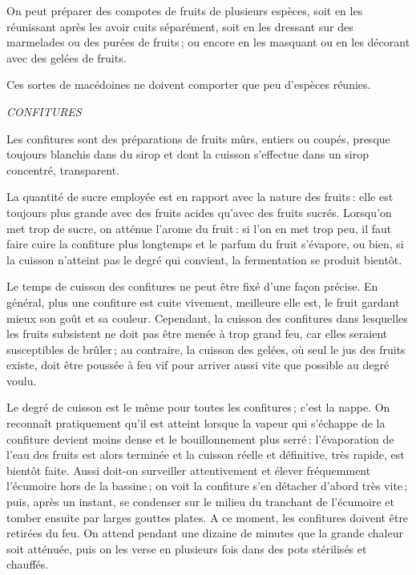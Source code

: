 On peut préparer des compotes de fruits de plusieurs espèces, soit en les
réunissant après les avoir cuits séparément, soit en les dressant sur des
marmelades ou des purées de fruits ; ou encore en les masquant ou en les
décorant avec des gelées de fruits.

Ces sortes de macédoines ne doivent comporter que peu d'espèces réunies.

\bigskip

\begin{center}
\textit{CONFITURES}
\end{center}

\bigskip


Les confitures sont des préparations de fruits mûrs, entiers ou coupés, presque
toujours blanchis dans du sirop et dont la cuisson s'effectue dans un sirop
concentré, transparent.

La quantité de sucre employée est en rapport avec la nature des fruits : elle
est toujours plus grande avec des fruits acides qu'avec des fruits sucrés.
Lorsqu'on met trop de sucre, on atténue l’arome du fruit : si l'on en met trop
peu, il faut faire cuire la confiture plus longtemps et le parfum du fruit
s'évapore, ou bien, si la cuisson n'atteint pas le degré qui convient, la
fermentation se produit bientôt.

\medskip

Le temps de cuisson des confitures ne peut être fixé d'une façon précise. En
général, plus une confiture est cuite vivement, meilleure elle est, le fruit
gardant mieux son goût et sa couleur. Cependant, la cuisson des confitures dans
lesquelles les fruits subsistent ne doit pas être menée à trop grand feu, car
elles seraient susceptibles de brûler ; au contraire, la cuisson des gelées, où
seul le jus des fruits existe, doit être poussée à feu vif pour arriver aussi
vite que possible au degré voulu.

Le degré de cuisson est le même pour toutes les confitures ; c'est la nappe. On
reconnaît pratiquement qu'il est atteint lorsque la vapeur qui s'échappe de la
confiture devient moins dense et le bouillonnement plus serré : l’évaporation
de l'eau des fruits est alors terminée et la cuisson réelle et définitive, très
rapide, est bientôt faite. Aussi doit-on surveiller attentivement et élever
fréquemment l'écumoire hors de la bassine ; on voit la confiture s'en détacher
d'abord très vite ; puis, après un instant, se condenser sur le milieu du
tranchant de l'écumoire et tomber ensuite par larges gouttes plates. A ce
moment, les confitures doivent être retirées du feu. On attend pendant une
dizaine de minutes que la grande chaleur soit atténuée, puis on les verse en
plusieurs fois dans des pots stérilisés et chauffés.

